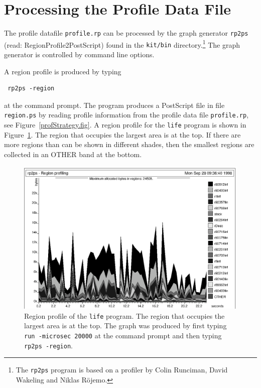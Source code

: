 \documentclass[12pt]{book}
\begin{document}
\section{Processing the Profile Data File}
The profile datafile {\tt profile.rp} can be processed by the 
%
graph generator {\tt rp2ps} (read: RegionProfile2PostScript) found
in the {\tt kit/bin} directory.\footnote{The {\tt rp2ps} program is based on a profiler by
  Colin Runciman, David Wakeling and Niklas R\"{o}jemo.} The graph
generator is controlled by command line options.

A 
%
%
region profile is produced by typing
\begin{verbatim}
 rp2ps -region
\end{verbatim}
at the command prompt. The program produces a PostScript file in
file {\tt region.ps} by reading profile information from the 
%
profile data file {\tt profile.rp}, see Figure~\ref{profStrategy.fig}.
A region profile for the {\tt life} program is shown in
Figure~\ref{prof_eks1.fig}. The region that occupies the largest area
is at the top. If there are more regions than can be shown in
different shades, then the smallest regions are collected in an OTHER
band at the bottom.

\begin{figure}
\begin{center}
\includegraphics{prof_eks1.ps}
\end{center}
\caption{Region profile of the {\tt life} program. The region 
  that occupies the largest area is at the top. The graph was 
  produced by first typing \texttt{run -microsec 20000} at the
  command prompt and then typing \texttt{rp2ps -region}.}
\label{prof_eks1.fig}
\end{figure}
\end{document}
